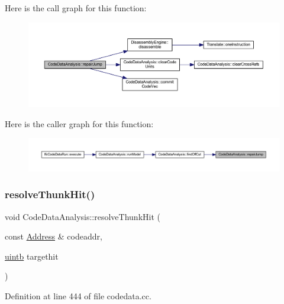Here is the call graph for this function\+:
\nopagebreak
\begin{figure}[H]
\begin{center}
\leavevmode
\includegraphics[width=350pt]{class_code_data_analysis_a0c1f590455ec5bdd79d45bfe73b0a640_cgraph}
\end{center}
\end{figure}
Here is the caller graph for this function\+:
\nopagebreak
\begin{figure}[H]
\begin{center}
\leavevmode
\includegraphics[width=350pt]{class_code_data_analysis_a0c1f590455ec5bdd79d45bfe73b0a640_icgraph}
\end{center}
\end{figure}
\mbox{\label{class_code_data_analysis_ad565b8a13360e457de73216e3556b583}} 
\subsubsection{\texorpdfstring{resolveThunkHit()}{resolveThunkHit()}}
{\footnotesize\ttfamily void Code\+Data\+Analysis\+::resolve\+Thunk\+Hit (\begin{DoxyParamCaption}\item[{const \mbox{\hyperlink{class_address}{Address}} \&}]{codeaddr,  }\item[{\mbox{\hyperlink{types_8h_a2db313c5d32a12b01d26ac9b3bca178f}{uintb}}}]{targethit }\end{DoxyParamCaption})}



Definition at line 444 of file codedata.\+cc.

